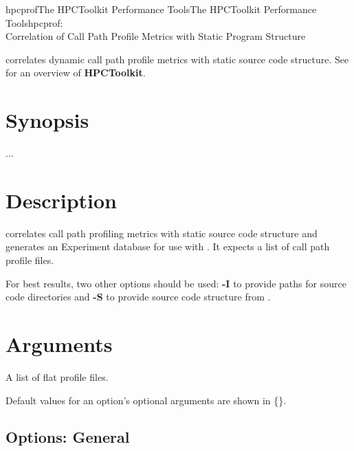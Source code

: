 \documentclass[english]{article}
\begin{document}
\begin{Name}{1}{hpcprof}{The HPCToolkit Performance Tools}{The HPCToolkit Performance Tools}{hpcprof:\\ Correlation of Call Path Profile Metrics with Static Program Structure}

 correlates dynamic call path profile metrics with static source code structure.  See  for an overview of \textbf{HPCToolkit}.

\end{Name}

\section{Synopsis}

  ...

\section{Description}

 correlates call path profiling metrics with static source code structure and generates an Experiment database for use with .
It expects a list of call path profile files.

For best results, two other options should be used: \textbf{-I} to provide paths for source code directories and \textbf{-S} to provide source code structure from .

\section{Arguments}

\begin{Description}
\item[\Arg{profile-file...}] A list of flat profile files.
\end{Description}

Default values for an option's optional arguments are shown in \{\}.

\subsection{Options: General}
\end{document}
